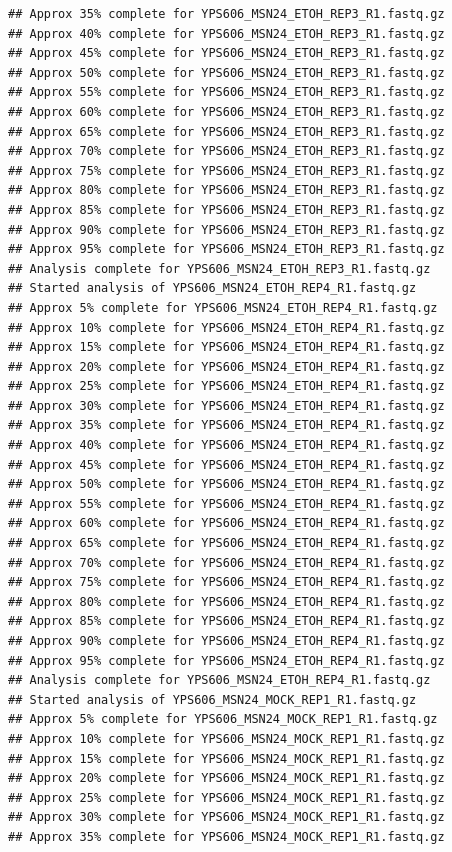 \documentclass[
]{book}
\begin{document}
\begin{verbatim}
## Approx 35% complete for YPS606_MSN24_ETOH_REP3_R1.fastq.gz
## Approx 40% complete for YPS606_MSN24_ETOH_REP3_R1.fastq.gz
## Approx 45% complete for YPS606_MSN24_ETOH_REP3_R1.fastq.gz
## Approx 50% complete for YPS606_MSN24_ETOH_REP3_R1.fastq.gz
## Approx 55% complete for YPS606_MSN24_ETOH_REP3_R1.fastq.gz
## Approx 60% complete for YPS606_MSN24_ETOH_REP3_R1.fastq.gz
## Approx 65% complete for YPS606_MSN24_ETOH_REP3_R1.fastq.gz
## Approx 70% complete for YPS606_MSN24_ETOH_REP3_R1.fastq.gz
## Approx 75% complete for YPS606_MSN24_ETOH_REP3_R1.fastq.gz
## Approx 80% complete for YPS606_MSN24_ETOH_REP3_R1.fastq.gz
## Approx 85% complete for YPS606_MSN24_ETOH_REP3_R1.fastq.gz
## Approx 90% complete for YPS606_MSN24_ETOH_REP3_R1.fastq.gz
## Approx 95% complete for YPS606_MSN24_ETOH_REP3_R1.fastq.gz
## Analysis complete for YPS606_MSN24_ETOH_REP3_R1.fastq.gz
## Started analysis of YPS606_MSN24_ETOH_REP4_R1.fastq.gz
## Approx 5% complete for YPS606_MSN24_ETOH_REP4_R1.fastq.gz
## Approx 10% complete for YPS606_MSN24_ETOH_REP4_R1.fastq.gz
## Approx 15% complete for YPS606_MSN24_ETOH_REP4_R1.fastq.gz
## Approx 20% complete for YPS606_MSN24_ETOH_REP4_R1.fastq.gz
## Approx 25% complete for YPS606_MSN24_ETOH_REP4_R1.fastq.gz
## Approx 30% complete for YPS606_MSN24_ETOH_REP4_R1.fastq.gz
## Approx 35% complete for YPS606_MSN24_ETOH_REP4_R1.fastq.gz
## Approx 40% complete for YPS606_MSN24_ETOH_REP4_R1.fastq.gz
## Approx 45% complete for YPS606_MSN24_ETOH_REP4_R1.fastq.gz
## Approx 50% complete for YPS606_MSN24_ETOH_REP4_R1.fastq.gz
## Approx 55% complete for YPS606_MSN24_ETOH_REP4_R1.fastq.gz
## Approx 60% complete for YPS606_MSN24_ETOH_REP4_R1.fastq.gz
## Approx 65% complete for YPS606_MSN24_ETOH_REP4_R1.fastq.gz
## Approx 70% complete for YPS606_MSN24_ETOH_REP4_R1.fastq.gz
## Approx 75% complete for YPS606_MSN24_ETOH_REP4_R1.fastq.gz
## Approx 80% complete for YPS606_MSN24_ETOH_REP4_R1.fastq.gz
## Approx 85% complete for YPS606_MSN24_ETOH_REP4_R1.fastq.gz
## Approx 90% complete for YPS606_MSN24_ETOH_REP4_R1.fastq.gz
## Approx 95% complete for YPS606_MSN24_ETOH_REP4_R1.fastq.gz
## Analysis complete for YPS606_MSN24_ETOH_REP4_R1.fastq.gz
## Started analysis of YPS606_MSN24_MOCK_REP1_R1.fastq.gz
## Approx 5% complete for YPS606_MSN24_MOCK_REP1_R1.fastq.gz
## Approx 10% complete for YPS606_MSN24_MOCK_REP1_R1.fastq.gz
## Approx 15% complete for YPS606_MSN24_MOCK_REP1_R1.fastq.gz
## Approx 20% complete for YPS606_MSN24_MOCK_REP1_R1.fastq.gz
## Approx 25% complete for YPS606_MSN24_MOCK_REP1_R1.fastq.gz
## Approx 30% complete for YPS606_MSN24_MOCK_REP1_R1.fastq.gz
## Approx 35% complete for YPS606_MSN24_MOCK_REP1_R1.fastq.gz

\end{verbatim}
\end{document}
